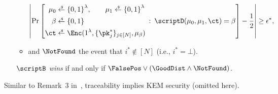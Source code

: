 \begin{definition}[traceability]
\begin{itemize}
\begin{itemize}
\begin{align*}
\left|\Pr\left[
\begin{aligned}
\mu_0&{}\draws\bit^\lambda,\qquad
\mu_1\draws\bit^\lambda\\
\beta&{}\draws\bit\\
\ct&{}\draws\Enc(1^\lambda,\{\pk^\ast_j\}_{j\in[N]},\mu_\beta)
\end{aligned}
\::\:
\scriptD(\mu_0,\mu_1,\ct)=\beta
\right]-\frac12
\right|
\geq\epsilon^\ast,
\end{align*}
\item and
$\NotFound$ the event that ${i^\ast\notin[N]}$ (i.e., ${i^\ast=\bot}$).
\end{itemize}
$\scriptB$ \emph{wins} if and only if ${\FalsePos\vee(\GoodDist\wedge\NotFound)}$.
\end{itemize}
\end{definition}

\noindent
Similar to Remark~3 in~\cite{EPRINT:Zhandry20a},
traceability implies KEM security (omitted here).

